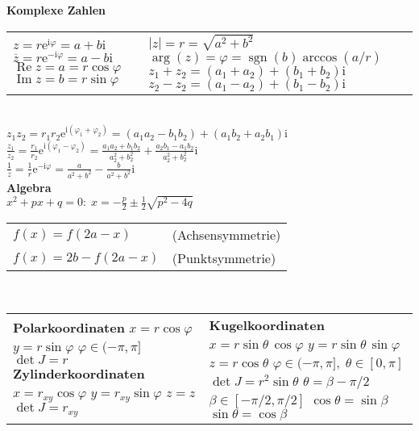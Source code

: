 \documentclass[a4paper,10pt,fleqn,twoside,twocolumn,dvipdfmx]{scrartcl}
\newcommand{\ee}{\mathrm e}
\newcommand{\ui}{\mathrm i}
\newcommand{\real}{\operatorname{Re}}
\newcommand{\imag}{\operatorname{Im}}
\newcommand{\sgn}{\operatorname{sgn}}
\newcommand{\strong}[1]{\textsf{\textbf{#1}}}
\newcommand{\ds}{\displaystyle}
\begin{document}
\newpage
\noindent
\strong{Komplexe Zahlen}\\
\begin{tabular}{@{}l|l}
\makecell[lt]{
$z = r\ee^{\ui\varphi} = a+b\ui$\\
$\overline z = r\ee^{-\ui\varphi} = a-b\ui$\\
$\real z = a = r\cos\varphi$\\
$\imag z = b = r\sin\varphi$
} & \makecell[lt]{
$|z| = r = \sqrt{a^2+b^2}$\\
$\ds\arg(z) =\varphi = \sgn(b)\arccos(a/r)$\\
$z_1+z_2 = (a_1+a_2)+(b_1+b_2)\ui$\\
$z_2-z_2 = (a_1-a_2)+(b_1-b_2)\ui$\\
}
\end{tabular}\\[2pt]
$z_1 z_2 = r_1 r_2 \ee^{\ui(\varphi_1+\varphi_2)}
= (a_1 a_2 - b_1 b_2)+(a_1 b_2+a_2 b_1)\ui$\\
$\ds\frac{z_1}{z_2}
=\frac{r_1}{r_2}\ee^{\ui(\varphi_1-\varphi_2)}
=\frac{a_1 a_2 + b_1 b_2}{a_2^2+b_2^2}
+ \frac{a_2 b_1 - a_1 b_2}{a_2^2+b_2^2}\ui$\\
$\ds\frac{1}{z} =\frac{1}{r}\ee^{-\ui\varphi}
=\frac{a}{a^2+b^2}-\frac{b}{a^2+b^2}\ui$\\[2pt]
\strong{Algebra}\\
$x^2+px+q=0\colon\; x = -\frac{p}{2}\pm\frac{1}{2}\sqrt{p^2-4q}$\\[2pt]
\begin{tabular}{@{}ll}
$f(x)=f(2a-x)$ & (Achsensymmetrie)\\
$f(x)=2b-f(2a-x)$ & (Punktsymmetrie)
\end{tabular}\\[2pt]
\begin{tabular}{@{}l|l}
\makecell[lt]{
\strong{Polarkoordinaten}\\
$x = r\cos\varphi$\\
$y = r\sin\varphi$\\
$\varphi\in(-\pi,\pi]$\\
$\det J = r$\\[4pt]
\strong{Zylinderkoordinaten}\\
$x = r_{xy}\cos\varphi$\\
$y = r_{xy}\sin\varphi$\\
$z = z$\\
$\det J = r_{xy}$
} & \makecell[lt]{
\strong{Kugelkoordinaten}\\
$x = r\sin\theta\,\cos\varphi$\\
$y = r\sin\theta\,\sin\varphi$\\
$z = r\cos\theta$\\
$\varphi\in(-\pi,\pi],\;\theta\in[0,\pi]$\\
$\det J = r^2\sin\theta$\\[4pt]
$\theta = \beta-\pi/2$\\
$\beta\in[-\pi/2,\pi/2]$\\
$\cos\theta = \sin\beta$\\
$\sin\theta = \cos\beta$
}
\end{tabular}\\[4pt]
\end{document}
